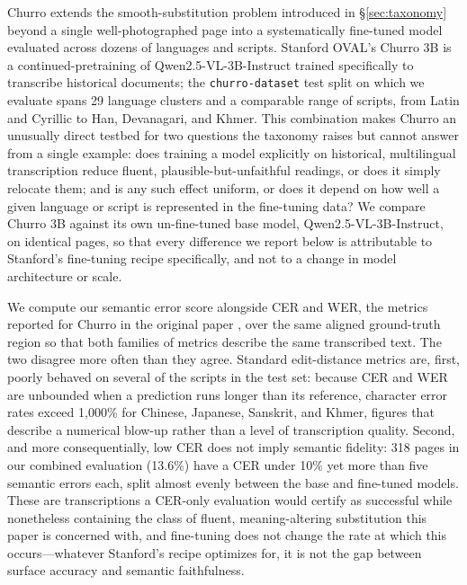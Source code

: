 Churro extends the smooth-substitution problem introduced in \S\ref{sec:taxonomy}
beyond a single well-photographed page into a systematically fine-tuned model
evaluated across dozens of languages and scripts. Stanford OVAL's Churro 3B
\citep{semnani_churro_2025} is a continued-pretraining of
Qwen2.5-VL-3B-Instruct trained specifically to transcribe historical
documents; the \texttt{churro-dataset} test split on which we evaluate spans
29 language clusters and a comparable range of scripts, from Latin and
Cyrillic to Han, Devanagari, and Khmer. This combination makes Churro an
unusually direct testbed for two questions the taxonomy raises but cannot
answer from a single example: does training a model explicitly on
historical, multilingual transcription reduce fluent, plausible-but-unfaithful
readings, or does it simply relocate them; and is any such effect uniform, or
does it depend on how well a given language or script is represented in the
fine-tuning data? We compare Churro 3B against its own un-fine-tuned base
model, Qwen2.5-VL-3B-Instruct, on identical pages, so that every difference
we report below is attributable to Stanford's fine-tuning recipe specifically,
and not to a change in model architecture or scale.

We compute our semantic error score alongside CER and WER, the metrics
reported for Churro in the original paper \citep{semnani_churro_2025}, over
the same aligned ground-truth region so that both families of metrics
describe the same transcribed text. The two disagree more often than they
agree. Standard edit-distance metrics are, first, poorly behaved on several
of the scripts in the test set: because CER and WER are unbounded when a
prediction runs longer than its reference, character error rates exceed
1,000\% for Chinese, Japanese, Sanskrit, and Khmer, figures that describe a
numerical blow-up rather than a level of transcription quality. Second, and
more consequentially, low CER does not imply semantic fidelity: 318 pages in
our combined evaluation (13.6\%) have a CER under 10\% yet more than five
semantic errors each, split almost evenly between the base and fine-tuned
models. These are transcriptions a CER-only evaluation would certify as
successful while nonetheless containing the class of fluent, meaning-altering
substitution this paper is concerned with, and fine-tuning does not change the
rate at which this occurs---whatever Stanford's recipe optimizes for, it is
not the gap between surface accuracy and semantic faithfulness.

